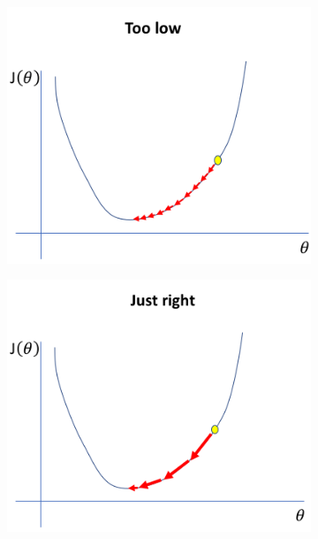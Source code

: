 \begin{figure}[H]
\begin{subfigure}{.33\textwidth}
  \centering
  \includegraphics[width=.99\linewidth]{figs/TooLow}
  \caption{}
  \label{fig:TooLow}
\end{subfigure}%
\begin{subfigure}{.33\textwidth}
  \centering
  \includegraphics[width=.99\linewidth]{figs/JustRight}
  \caption{}
  \label{fig:JustRight}
\end{subfigure}
\begin{subfigure}{.33\textwidth}

\end{subfigure}
\end{figure}
